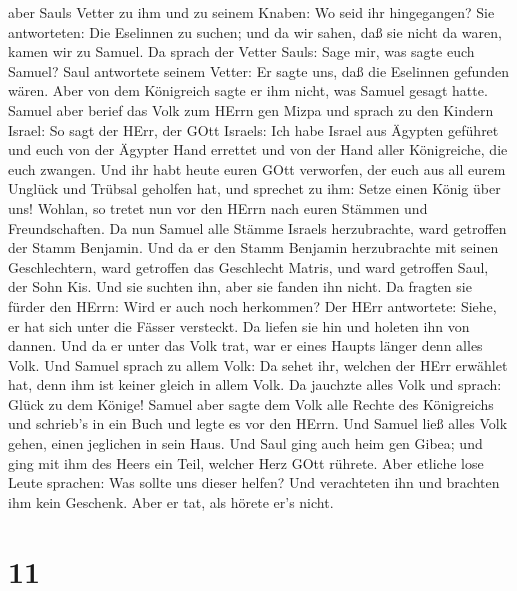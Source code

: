 aber Sauls Vetter zu ihm und zu seinem Knaben: Wo seid ihr hingegangen?
Sie antworteten: Die Eselinnen zu suchen; und da wir sahen, daß sie
nicht da waren, kamen wir zu Samuel.  Da sprach der Vetter
Sauls: Sage mir, was sagte euch Samuel?  Saul antwortete
seinem Vetter: Er sagte uns, daß die Eselinnen gefunden wären. Aber von
dem Königreich sagte er ihm nicht, was Samuel gesagt hatte.
 Samuel aber berief das Volk zum HErrn gen Mizpa
 und sprach zu den Kindern Israel: So sagt der HErr, der
GOtt Israels: Ich habe Israel aus Ägypten geführet und euch von der
Ägypter Hand errettet und von der Hand aller Königreiche, die euch
zwangen.  Und ihr habt heute euren GOtt verworfen, der euch
aus all eurem Unglück und Trübsal geholfen hat, und sprechet zu ihm:
Setze einen König über uns! Wohlan, so tretet nun vor den HErrn nach
euren Stämmen und Freundschaften.  Da nun Samuel alle
Stämme Israels herzubrachte, ward getroffen der Stamm Benjamin.
 Und da er den Stamm Benjamin herzubrachte mit seinen
Geschlechtern, ward getroffen das Geschlecht Matris, und ward getroffen
Saul, der Sohn Kis. Und sie suchten ihn, aber sie fanden ihn nicht.
 Da fragten sie fürder den HErrn: Wird er auch noch
herkommen? Der HErr antwortete: Siehe, er hat sich unter die Fässer
versteckt.  Da liefen sie hin und holeten ihn von dannen.
Und da er unter das Volk trat, war er eines Haupts länger denn alles
Volk.  Und Samuel sprach zu allem Volk: Da sehet ihr,
welchen der HErr erwählet hat, denn ihm ist keiner gleich in allem Volk.
Da jauchzte alles Volk und sprach: Glück zu dem Könige! 
Samuel aber sagte dem Volk alle Rechte des Königreichs und schrieb's in
ein Buch und legte es vor den HErrn. Und Samuel ließ alles Volk gehen,
einen jeglichen in sein Haus.  Und Saul ging auch heim gen
Gibea; und ging mit ihm des Heers ein Teil, welcher Herz GOtt rührete.
 Aber etliche lose Leute sprachen: Was sollte uns dieser
helfen? Und verachteten ihn und brachten ihm kein Geschenk. Aber er tat,
als hörete er's nicht.

\hypertarget{section-10}{%
\section{11}\label{section-10}}

